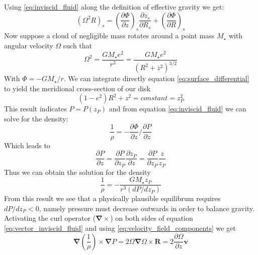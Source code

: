 \documentclass[a4paper,modern]{aastex62}
\renewcommand{\vec}[1]{\mathbf{#1}}
\begin{document}
Using \ref{eq:inviscid_fluid} along the definition of effective gravity we get:
\begin{equation}\label{eq:surface_differential}
\left( \Omega^2R \right)_s = \left( \frac{\partial \Phi}{\partial z} \right)_s \frac{\partial z_s}{\partial R_s} + \left( \frac{\partial \Phi}{\partial R} \right)_s
\end{equation}
Now suppose a cloud of negligible mass rotates around a point mass $M_\star$ with angular velocity $\Omega$ such that 
\begin{equation}
\Omega^2=\frac{GM_\star e^2}{r^3}=\frac{GM_\star e^2}{(R^2+z^2)^{3/2}}
\end{equation}
With $\Phi=-GM_\star/r$.
We can integrate directly equation \ref{eq:surface_differential} to yield the meridional cross-section of our disk
\begin{equation}
(1-e^2)R^2+z^2=constant=z^2_P
\end{equation}
This result indicates $P=P(z_P)$ and from equation \ref{eq:inviscid_fluid} we can solve for the density:
\begin{equation}
\frac{1}{\rho}=-\frac{\partial \Phi}{\partial z} / \frac{\partial P}{\partial z}
\end{equation}
Which leads to 
\begin{equation}
\frac{\partial P}{\partial z} = \frac{\partial P}{\partial z_P}\frac{\partial z_P}{\partial z} = \frac{\partial P}{\partial z_P}\frac{z }{z_P}
\end{equation}
Thus we can obtain the solution for the density
\begin{equation}
\frac{1}{\rho}=-\frac{GM_\star z_P}{r^3(dP/dz_P)}
\end{equation}
From this result we see that a physically plausible equilibrum requires $dP/dz_P<0$, namely pressure must decrease outwards in order to balance gravity. 
Activating the curl operator ($\mathbf{\nabla}\times$) on both sides of equation \ref{eq:vector_inviscid_fluid} and using  \ref{eq:velocity_field_components} we get
\begin{equation}
    \vec\nabla\left(\frac{1}{\rho}\right)\times\vec\nabla P = 2\Omega \vec\nabla \Omega \times \vec R = 2\frac{\partial \Omega}{\partial z} \vec v
\end{equation}
\end{document}
